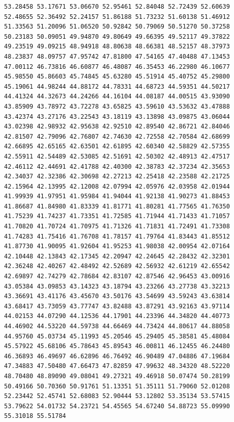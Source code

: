 \documentclass[12pt,a4paper,twoside,openright,titlepage,final]{article}
\begin{document}
\begin{verbatim}
53.28458 53.17671 53.06670 52.95461 52.84048 52.72439 52.60639 
52.48655 52.36492 52.24157 51.86188 51.73232 51.60138 51.46912 
51.33563 51.20096 51.06520 50.92842 50.79069 50.51270 50.37258 
50.23183 50.09051 49.94870 49.80649 49.66395 49.52117 49.37822 
49.23519 49.09215 48.94918 48.80638 48.66381 48.52157 48.37973 
48.23837 48.09757 47.95742 47.81800 47.54165 47.40488 47.13453 
47.00112 46.73816 46.60877 46.48087 46.35453 46.22980 46.10677 
45.98550 45.86603 45.74845 45.63280 45.51914 45.40752 45.29800 
45.19061 44.98244 44.88172 44.78331 44.68723 44.59351 44.50217 
44.41324 44.32673 44.24266 44.16104 44.08187 44.00515 43.93090 
43.85909 43.78972 43.72278 43.65825 43.59610 43.53632 43.47888 
43.42374 43.27176 43.22543 43.18119 43.13898 43.09875 43.06044 
43.02398 42.98932 42.95638 42.92510 42.89540 42.86721 42.84046
42.81507 42.79096 42.76807 42.74630 42.72558 42.70584 42.68699 
42.66895 42.65165 42.63501 42.61895 42.60340 42.58829 42.57355 
42.55911 42.54489 42.53085 42.51691 42.50302 42.48913 42.47517 
42.46112 42.44691 42.41788 42.40300 42.38783 42.37234 42.35653 
42.34037 42.32386 42.30698 42.27213 42.25418 42.23588 42.21725 
42.15964 42.13995 42.12008 42.07994 42.05976 42.03958 42.01944 
41.99939 41.97951 41.95984 41.94044 41.92138 41.90273 41.88453 
41.86687 41.84980 41.83339 41.81771 41.80281 41.77565 41.76350 
41.75239 41.74237 41.73351 41.72585 41.71944 41.71433 41.71057 
41.70820 41.70724 41.70975 41.71326 41.71831 41.72491 41.73308 
41.74283 41.75416 41.76708 41.78157 41.79764 41.83443 41.85512 
41.87730 41.90095 41.92604 41.95253 41.98038 42.00954 42.07164 
42.10448 42.13843 42.17345 42.20947 42.24645 42.28432 42.32301
42.36248 42.40267 42.48492 42.52689 42.56932 42.61219 42.65542 
42.69897 42.74279 42.78684 42.83107 42.87546 42.96453 43.00916 
43.05384 43.09853 43.14323 43.18794 43.23266 43.27738 43.32213 
43.36691 43.41176 43.45670 43.50176 43.54699 43.59243 43.63814 
43.68417 43.73059 43.77747 43.82488 43.87291 43.92163 43.97114 
44.02153 44.07290 44.12536 44.17901 44.23396 44.34820 44.40773 
44.46902 44.53220 44.59738 44.66469 44.73424 44.80617 44.88058 
44.95760 45.03734 45.11993 45.20546 45.29405 45.38581 45.48084 
45.57922 45.68106 45.78643 45.89543 46.00811 46.12455 46.24480 
46.36893 46.49697 46.62896 46.76492 46.90489 47.04886 47.19684 
47.34883 47.50480 47.66473 47.82859 47.99632 48.34320 48.52220 
48.70480 48.89090 49.08041 49.27321 49.46918 50.07474 50.28199 
50.49166 50.70360 50.91761 51.13351 51.35111 51.79060 52.01208
52.23442 52.45741 52.68083 52.90444 53.12802 53.35134 53.57415 
53.79622 54.01732 54.23721 54.45565 54.67240 54.88723 55.09990 
55.31018 55.51784
\end{verbatim}
\end{document}
